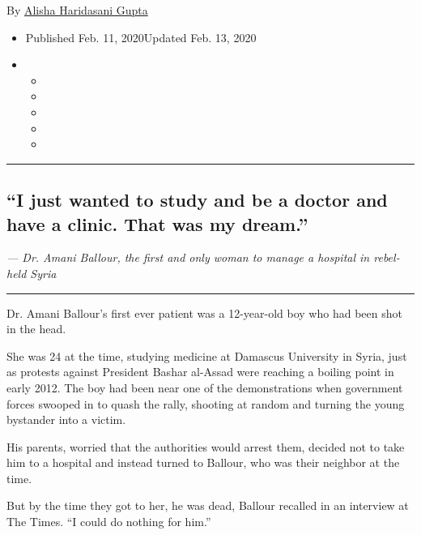 By \href{https://www.nytimes.com/by/alisha-haridasani-gupta}{Alisha
Haridasani Gupta}

\begin{itemize}
\item
  Published Feb. 11, 2020Updated Feb. 13, 2020
\item
  \begin{itemize}
  \item
  \item
  \item
  \item
  \item
  \end{itemize}
\end{itemize}

\begin{center}\rule{0.5\linewidth}{\linethickness}\end{center}

\hypertarget{i-just-wanted-to-study-and-be-a-doctor-and-have-a-clinic-that-was-my-dream}{%
\subsection{``I just wanted to study and be a doctor and have a clinic.
That was my
dream.''}\label{i-just-wanted-to-study-and-be-a-doctor-and-have-a-clinic-that-was-my-dream}}

\emph{--- Dr. Amani Ballour, the first and only woman to manage a
hospital in rebel-held Syria}

\begin{center}\rule{0.5\linewidth}{\linethickness}\end{center}

Dr. Amani Ballour's first ever patient was a 12-year-old boy who had
been shot in the head.

She was 24 at the time, studying medicine at Damascus University in
Syria, just as protests against President Bashar al-Assad were reaching
a boiling point in early 2012. The boy had been near one of the
demonstrations when government forces swooped in to quash the rally,
shooting at random and turning the young bystander into a victim.

His parents, worried that the authorities would arrest them, decided not
to take him to a hospital and instead turned to Ballour, who was their
neighbor at the time.

But by the time they got to her, he was dead, Ballour recalled in an
interview at The Times. ``I could do nothing for him.''

